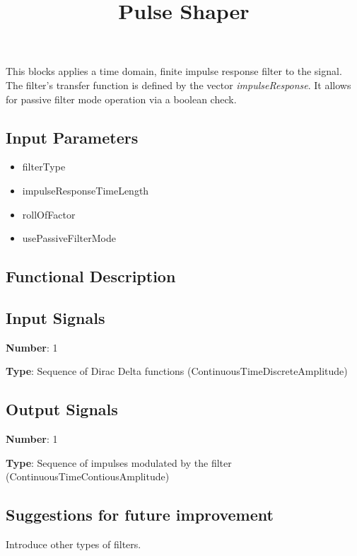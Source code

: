 \documentclass[a4paper]{article}
\title{Pulse Shaper}
\begin{document}
\maketitle

This blocks applies a time domain, finite impulse response filter to the signal. The filter's transfer function is defined by the vector \textit{impulseResponse}. It allows for passive filter mode operation via a boolean check.

\subsection*{Input Parameters}

\begin{itemize}
	\item filterType
	\item impulseResponseTimeLength
	\item rollOfFactor
	\item usePassiveFilterMode
\end{itemize}

\subsection*{Functional Description}

\subsection*{Input Signals}

\textbf{Number}: 1

\textbf{Type}: Sequence of Dirac Delta functions (ContinuousTimeDiscreteAmplitude)

\subsection*{Output Signals}

\textbf{Number}: 1

\textbf{Type}: Sequence of impulses modulated by the filter (ContinuousTimeContiousAmplitude)

\subsection*{Suggestions for future improvement}

Introduce other types of filters.
\end{document}
